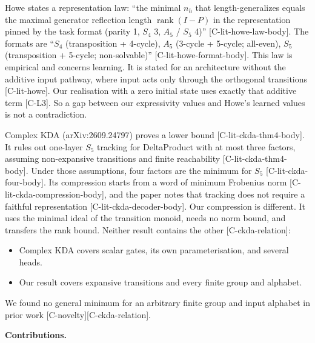 \documentclass[10pt,twocolumn,a4paper]{article}
\providecommand{\tightlist}{\setlength{\itemsep}{0pt}\setlength{\parskip}{0pt}}
\begin{document}
Howe states a representation law: ``the minimal \(n_h\) that length-generalizes equals the maximal generator reflection length \(\operatorname{rank}(I-P)\) in the representation pinned by the task format (parity 1, \(S_4\) 3, \(A_5\) / \(S_5\) 4)'' {[}C-lit-howe-law-body{]}. The formats are ``\(S_4\) (transposition + 4-cycle), \(A_5\) (3-cycle + 5-cycle; all-even), \(S_5\) (transposition + 5-cycle; non-solvable)'' {[}C-lit-howe-format-body{]}. This law is empirical and concerns learning. It is stated for an architecture without the additive input pathway, where input acts only through the orthogonal transitions {[}C-lit-howe{]}. Our realisation with a zero initial state uses exactly that additive term {[}C-L3{]}. So a gap between our expressivity values and Howe's learned values is not a contradiction.

Complex KDA (arXiv:2609.24797) proves a lower bound {[}C-lit-ckda-thm4-body{]}. It rules out one-layer \(S_5\) tracking for DeltaProduct with at most three factors, assuming non-expansive transitions and finite reachability {[}C-lit-ckda-thm4-body{]}. Under those assumptions, four factors are the minimum for \(S_5\) {[}C-lit-ckda-four-body{]}. Its compression starts from a word of minimum Frobenius norm {[}C-lit-ckda-compression-body{]}, and the paper notes that tracking does not require a faithful representation {[}C-lit-ckda-decoder-body{]}. Our compression is different. It uses the minimal ideal of the transition monoid, needs no norm bound, and transfers the rank bound. Neither result contains the other {[}C-ckda-relation{]}:

\begin{itemize}
\tightlist
\item
  Complex KDA covers scalar gates, its own parameterisation, and several heads.
\item
  Our result covers expansive transitions and every finite group and alphabet.
\end{itemize}

We found no general minimum for an arbitrary finite group and input alphabet in prior work {[}C-novelty{]}{[}C-ckda-relation{]}.

\textbf{Contributions.}
\end{document}
